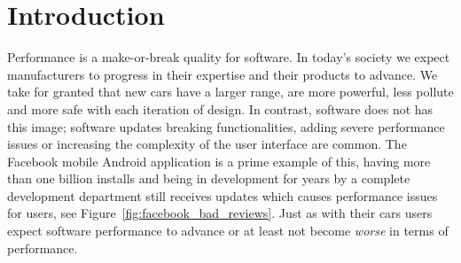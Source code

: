 \chapter{Introduction}
\label{chp:introduction}





% 

Performance is a make-or-break quality for software.
In today's society we expect manufacturers to progress in their expertise and their products to advance.
We take for granted that new cars have a larger range, are more powerful, less pollute and more safe with each iteration of design.
In contrast, software does not has this image; software updates breaking functionalities, adding severe performance issues or increasing the complexity of the user interface are common.
The Facebook mobile Android application is a prime example of this, having more than one billion installs and being in development for years by a complete development department still receives updates which causes performance issues for users, see Figure~\ref{fig:facebook_bad_reviews}.
Just as with their cars users expect software performance to advance or at least not become \emph{worse} in terms of performance. 

